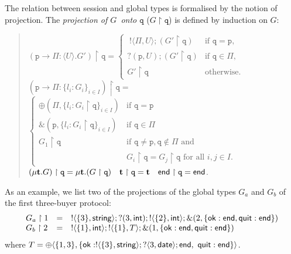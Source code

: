 \documentclass{article}
\newcommand{\kf}[1]{\textup{\textsf{#1}}\xspace}
\newcommand{\Ia}{\ensuremath{a}}
\newcommand{\Ib}{\ensuremath{b}}
\newcommand{\pset}{\ensuremath{\Pi}}
\newcommand{\participant}[1]{\ensuremath{\mathtt{#1}}}
\newcommand{\q}{\ensuremath{\participant{q}}}
\newcommand{\p}{\ensuremath{\participant{p}}}
\newcommand{\anglep}[2]{\ensuremath{\langle #1, #2\rangle}}
\newcommand{\set}[1]{\ensuremath{\{#1\}}}
\newcommand{\G}{\ensuremath{G}}
\newcommand{\Gv}[4]{\ensuremath{#1\to\pset:\langle#3\rangle.#4}}
\newcommand{\U}{\ensuremath{U}}
\newcommand{\pro}[2]{\ensuremath{#1\upharpoonright#2}}
\newcommand{\T}{\ensuremath{T}}
\newcommand{\UT}{\ensuremath{U}}
\newcommand{\oT}[2]{\ensuremath{\;!\langle #2,#1\rangle}}
\newcommand{\iT}[2]{\ensuremath{?( #2,#1 )}}
\newcommand{\ty}{\textbf{t}}
\newcommand{\End}{\kf{end}}
\newcommand{\seltypeG}{\ensuremath{\oplus(\pset,\{l_i:\pro{\G_i}\q\}_{i\in I})}}
\newcommand{\branchtypeG}{\ensuremath{\&(\p,\{l_i:\pro{\G_i}\q\}_{i\in I})}}
\begin{document}
The relation between session and global types is formalised by the
notion of projection. The {\em projection of \G\
onto \q} (\pro\G\q) is defined
by induction on \G:

\begin{quote}
{\small
$\pro{(\Gv\p\p\U{\G'})}\q=\begin{cases}
  \oT\UT{\pset};(\pro{\G'}\q)  & \text{if }\q=\p, \\
  \iT\UT{\p};(\pro{\G'}\q) & \text{if }\q\in\pset, \\
   \pro{\G'}\q & \text{otherwise}.
\end{cases}$\\
$\pro{(\p\rightarrow\pset:\{l_i:\G_i\}_{i\in I})}\q=$\\
\mbox{\qquad \qquad \qquad} $
 \begin{cases}
  \seltypeG & \text{if }\q=\p\\
  \branchtypeG& \text{if }\q\in\pset \\
   \pro{\G_1}\q  &\text{if }\q\not=\p,  \q\not\in\pset\text{ and }\\
     & \pro{\G_i}\q=\pro{\G_j}\q
   \text{ for all }i,j\in I.\end{cases}
$\\
$\pro{(\mu \ty.\G)}\q= \mu \ty.(\pro{\G}\q) \quad \pro\ty\q=\ty\quad\pro\End\q=
         \End$.\\[0.5mm]
}
\end{quote}

As an example, we list two of the projections of the global types $\G_\Ia$ and
$\G_\Ib$ of the first three-buyer protocol:
\[\begin{array}{lll}
 \pro{\G_\Ia}1&=& !\langle \{3\},\kf{string}\rangle;?( 3,\kf{int}); !\langle \{2\},\kf{int}\rangle;\&(2,\{\kf{ok}: \End , \kf{quit}: \End\})\\
\pro{\G_\Ib}2&=& !\langle \{1\},\kf{int}\rangle;!\langle \{1\},T\rangle;\&(1,\{\kf{ok}: \End , \kf{quit}: \End\})\\
\end{array}\]
\noindent
where $\T=\oplus\anglep{\set{1,3}}{\{\kf{ok}:!\langle \{3\},\kf{string}\rangle; ?\langle 3,\kf{date}\rangle;
\End,\ \kf{quit}: \End\}}$.\\
\end{document}

